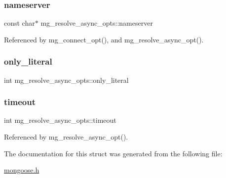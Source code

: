 \subsubsection{\texorpdfstring{nameserver}{nameserver}}
{\footnotesize\ttfamily const char$\ast$ mg\+\_\+resolve\+\_\+async\+\_\+opts\+::nameserver}



Referenced by mg\+\_\+connect\+\_\+opt(), and mg\+\_\+resolve\+\_\+async\+\_\+opt().

\mbox{\label{structmg__resolve__async__opts_ae7bb70da865548e33663e1292e334293_ae7bb70da865548e33663e1292e334293}} 
\subsubsection{\texorpdfstring{only\+\_\+literal}{only\_literal}}
{\footnotesize\ttfamily int mg\+\_\+resolve\+\_\+async\+\_\+opts\+::only\+\_\+literal}

\mbox{\label{structmg__resolve__async__opts_adeb3e0102e6e1eb86340e86fcc2b3560_adeb3e0102e6e1eb86340e86fcc2b3560}} 
\subsubsection{\texorpdfstring{timeout}{timeout}}
{\footnotesize\ttfamily int mg\+\_\+resolve\+\_\+async\+\_\+opts\+::timeout}



Referenced by mg\+\_\+resolve\+\_\+async\+\_\+opt().



The documentation for this struct was generated from the following file\+:\begin{DoxyCompactItemize}
\item 
\hyperlink{mongoose_8h}{mongoose.\+h}\end{DoxyCompactItemize}
